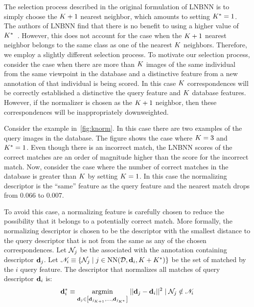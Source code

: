             The selection process described in the original formulation of LNBNN is to simply choose the $K +
            1$\th{} nearest neighbor, which amounts to setting $K^{*}=1$. The authors of LNBNN find that there is
            no benefit to using a higher value of $K^{*}$~\cite{mccann_local_2012}. However, this does not account
            for the case when the $K + 1$\th{} nearest neighbor belongs to the same class as one of the nearest
            $K$ neighbors. Therefore, we employ a slightly different selection process. To motivate our selection
            process, consider the case when there are more than $K$ images of the same individual from the same
            viewpoint in the database and a distinctive feature from a new annotation of that individual is being
            scored. In this case $K$ correspondences will be correctly established a distinctive the query feature
            and $K$ database features. However, if the normalizer is chosen as the $K + 1$ neighbor, then these
            correspondences will be inappropriately downweighted.
              
            Consider the example in~\cref{fig:knorm}. In this case there are two examples
             of the query images in the database. The figure shows the case where
            $K=3$ and $K^{*}=1$. Even though there is an incorrect match, the LNBNN scores of the correct matches
            are an order of magnitude higher than the score for the incorrect match. Now, consider the case where
            the number of correct matches in the database is greater than $K$ by setting $K=1$. In this case the
            normalizing descriptor is the ``same'' feature as the query feature and the nearest match drops from
            $0.066$ to $0.007$.

            \knorm{}

            To avoid this case, a normalizing feature is carefully chosen to reduce the possibility that it belongs
            to a potentially correct match. More formally, the normalizing descriptor is chosen to be the
            descriptor with the smallest distance to the query descriptor that is not from the same \name{} as any
            of the chosen correspondences. Let $\mathcal{N}_j$ be the \name{} associated with the annotation containing
            descriptor $\mathbf{d}_j$. Let %
            $\mathscr{N}_i \equiv \left\{\mathcal{N}_j \mid j \in \operatorname{NN}(\mathcal{D}, \mathbf{d}_i, K + K^{*})\right\}$
            be the set of \names{} matched by the $i$\th{} query feature. The descriptor that normalizes all
            matches of query descriptor $\mathbf{d}_i$ is:
              \begin{equation}
                  \mathbf{d}^{*}_{i} \equiv 
                  \underset{\mathbf{d}_j \in \left[\mathbf{d}_{{j_{K + 1}}}, \ldots{}, \mathbf{d}_{j_{K^{*}}}\right]}{\operatorname{argmin}}\;
                  ||\mathbf{d}_j - \mathbf{d}_i||^2 \mid \mathcal{N}_j \notin \mathscr{N}_i
              \end{equation}

